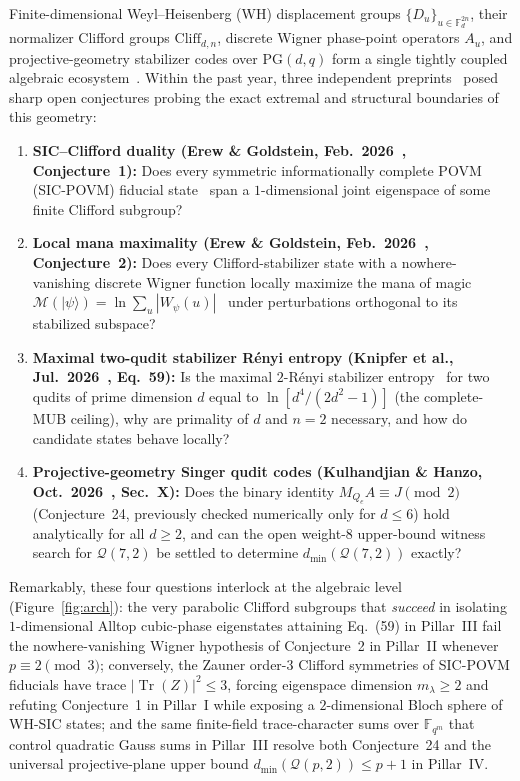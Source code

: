 \documentclass[11pt,letterpaper]{article}
\theoremstyle{plain}
\theoremstyle{definition}
\theoremstyle{remark}
\newcommand{\F}{\mathbb{F}}
\newcommand{\Tr}{\operatorname{Tr}}
\newcommand{\Cliff}{\mathrm{Cliff}}
\newcommand{\PG}{\mathrm{PG}}
\newcommand{\Qcode}{\mathcal{Q}}
\newcommand{\Mana}{\mathcal{M}}
\newcommand{\ket}[1]{\lvert #1 \rangle}
\begin{document}
Finite-dimensional Weyl--Heisenberg (WH) displacement groups $\{D_u\}_{u\in\F_d^{2n}}$, their normalizer Clifford groups $\Cliff_{d,n}$, discrete Wigner phase-point operators $A_u$, and projective-geometry stabilizer codes over $\PG(d,q)$ form a single tightly coupled algebraic ecosystem~\cite{Gross2006,Appleby2005,Veitch2014,Leone2022,Singer1938}. Within the past year, three independent preprints~\cite{ErewGoldstein2026,Knipfer2026,KulhandjianHanzo2026} posed sharp open conjectures probing the exact extremal and structural boundaries of this geometry:
\begin{enumerate}[leftmargin=2em,itemsep=3pt]
  \item \textbf{SIC--Clifford duality (Erew \& Goldstein, Feb.~2026~\cite{ErewGoldstein2026}, Conjecture~1):} Does every symmetric informationally complete POVM (SIC-POVM) fiducial state~\cite{Zauner2011,Renes2004,ScottGrassl2010} span a $1$-dimensional joint eigenspace of some finite Clifford subgroup?
  \item \textbf{Local mana maximality (Erew \& Goldstein, Feb.~2026~\cite{ErewGoldstein2026}, Conjecture~2):} Does every Clifford-stabilizer state with a nowhere-vanishing discrete Wigner function locally maximize the mana of magic $\Mana(\ket{\psi})=\ln\sum_u|W_\psi(u)|$~\cite{Veitch2014} under perturbations orthogonal to its stabilized subspace?
  \item \textbf{Maximal two-qudit stabilizer R\'enyi entropy (Knipfer et al., Jul.~2026~\cite{Knipfer2026}, Eq.~59):} Is the maximal $2$-R\'enyi stabilizer entropy~\cite{Leone2022,WangLi2023} for two qudits of prime dimension $d$ equal to $\ln[d^4/(2d^2-1)]$ (the complete-MUB ceiling), why are primality of $d$ and $n=2$ necessary, and how do candidate states behave locally?
  \item \textbf{Projective-geometry Singer qudit codes (Kulhandjian \& Hanzo, Oct.~2026~\cite{KulhandjianHanzo2026}, Sec.~X):} Does the binary identity $M_{Q_e}A\equiv J\pmod 2$ (Conjecture~24, previously checked numerically only for $d\le 6$) hold analytically for all $d\ge 2$, and can the open weight-$8$ upper-bound witness search for $\Qcode(7,2)$ be settled to determine $d_{\min}(\Qcode(7,2))$ exactly?
\end{enumerate}

Remarkably, these four questions interlock at the algebraic level (Figure~\ref{fig:arch}): the very parabolic Clifford subgroups that \emph{succeed} in isolating $1$-dimensional Alltop cubic-phase eigenstates attaining Eq.~(59) in Pillar~III fail the nowhere-vanishing Wigner hypothesis of Conjecture~2 in Pillar~II whenever $p\equiv 2\pmod 3$; conversely, the Zauner order-$3$ Clifford symmetries of SIC-POVM fiducials have trace $|\Tr(Z)|^2\le 3$, forcing eigenspace dimension $m_\lambda\ge 2$ and refuting Conjecture~1 in Pillar~I while exposing a $2$-dimensional Bloch sphere of WH-SIC states; and the same finite-field trace-character sums over $\F_{q^m}$ that control quadratic Gauss sums in Pillar~III resolve both Conjecture~24 and the universal projective-plane upper bound $d_{\min}(\Qcode(p,2))\le p+1$ in Pillar~IV.
\end{document}
